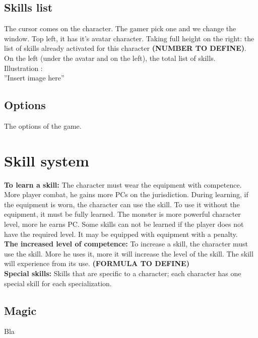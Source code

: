 \documentclass[a4paper,12pt]{book}
\begin{document}
\subsection{Skills list}
The cursor comes on the character. The gamer pick one and we change the window. Top left, it has it's avatar character. Taking full height on the right: the list of skills already activated for this character \textbf{(NUMBER TO DEFINE)}. On the left (under the avatar and on the left), the total list of skills. \\ Illustration : \\ ''Insert image here''
\subsection{Options}
The options of the game.
\section{Skill system}
\textbf{To learn a skill:} The character must wear the equipment with competence. More player combat, he gains more PCs on the jurisdiction. During learning, if the equipment is worn, the character can use the skill. To use it without the equipment, it must be fully learned. The monster is more powerful character level, more he earns PC. Some skills can not be learned if the player does not have the required level. It may be equipped with equipment with a penalty. \\
\textbf{The increased level of competence:} To increase a skill, the character must use the skill. More he uses it, more it will increase the level of the skill. The skill will experience from its use. \textbf{(FORMULA TO DEFINE)} \\
\textbf{Special skills:} Skills that are specific to a character; each character has one special skill for each specialization.
\subsection{Magic}
Bla
\end{document}
